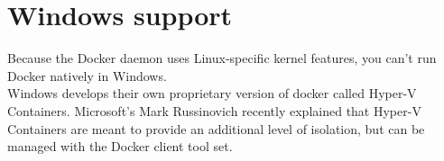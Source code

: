 \section{Windows support}
Because the Docker daemon uses Linux-specific kernel features, you can’t run Docker natively in Windows. \\

Windows develops their own proprietary version of docker called Hyper-V Containers.
Microsoft's Mark Russinovich recently explained that Hyper-V Containers are meant to provide an additional level of isolation, but can be managed with the Docker client tool set.



